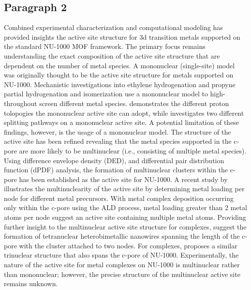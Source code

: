 \documentclass[journal=jctcce,manuscript=article]{achemso}
\begin{document}
\subsection{Paragraph 2}
Combined experimental characterization and computational modeling has provided insights the active site structure for 3d transition metals supported on the standard NU-1000 MOF framework. The primary focus remains understanding the exact composition of the active site structure that are dependent on the number of metal species. A mononuclear (single-site) model was originally thought to be the active site structure for metals supported on NU-1000.\cite{Li2016sintering,AbdelMageed2019,Gallington2016} Mechanistic investigations into ethylene hydrogenation\cite{Shabbir2020} and propyne partial hydrogenation and isomerization\cite{Hackler2020} use a mononuclear model to high-throughout screen different metal species. \citeauthor{Shabbir2020} demonstrates the different proton tolopogies the mononuclear active site can adopt,\cite{Shabbir2020} while \citeauthor{Hackler2020} investigates two different  splitting pathways on a mononuclear active site.\cite{Hackler2020} A potential limitation of these findings, however, is the usage of a mononuclear model. The structure of the active site has been refined revealing that the metal species supported in the c-pore are more likely to be multinuclear (i.e., consisting of multiple metal species). Using difference envelope density (DED),\cite{Li2017} and differential pair distribution function (dPDF) analysis,\cite{PlateroPrats2017} the formation of multinuclear clusters within the c-pore has been established as the active site for NU-1000. A recent study by \citeauthor{Kim2020}  illustrates the multinuclearity of the active site by determining metal loading per node for different metal precursors.\cite{Kim2020} With metal complex deposition occurring only within the c-pore using the ALD process, metal loading greater than 2 metal atoms per node suggest an active site containing multiple metal atoms. Providing further insight to the multinuclear active site structure for  complexes, \citeauthor{PlateroPrats2017} suggest the formation of tetranuclear heterobimetallic nanowires spanning the length of the c-pore with the cluster attached to two nodes.\citeauthor{PlateroPrats2017} For  complexes, \citeauthor{Ikuno2017} proposes a similar trinuclear structure that also spans the c-pore of NU-1000. Experimentally, the nature of the active site for metal complexes on NU-1000 is multinuclear rather than mononuclear; however, the precise structure of the multinuclear active site remains unknown. 
\end{document}
